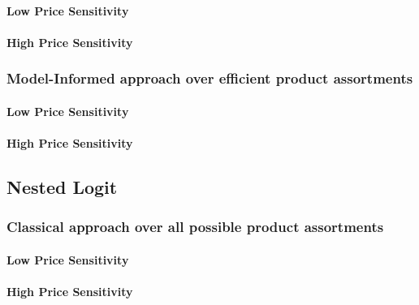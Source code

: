 \paragraph{Low Price Sensitivity}



\paragraph{High Price Sensitivity}



\subsubsection{Model-Informed approach over efficient product assortments}

\paragraph{Low Price Sensitivity}



\paragraph{High Price Sensitivity}



\subsection{Nested Logit}

\subsubsection{Classical approach over all possible product assortments}

\paragraph{Low Price Sensitivity}



\paragraph{High Price Sensitivity}

